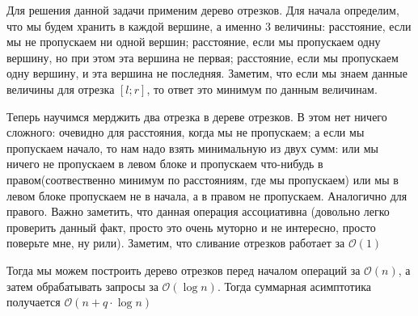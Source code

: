 \documentclass[12pt,a4paper]{report}
\begin{document}
Для решения данной задачи применим дерево отрезков. Для начала определим, что мы будем хранить в каждой вершине, а именно 3 величины: расстояние, если мы не пропускаем ни одной вершин; расстояние, если мы пропускаем одну вершину, но при этом эта вершина не первая; расстояние, если мы пропускаем одну вершину, и эта вершина не последняя. Заметим, что если мы знаем данные величины для отрезка $[l; r]$, то ответ это минимум по данным величинам.\par
Теперь научимся мерджить два отрезка в дереве отрезков. В этом нет ничего сложного: очевидно для расстояния, когда мы не пропускаем; а если мы пропускаем начало, то нам надо взять минимальную из двух сумм: или мы ничего не пропускаем в левом блоке и пропускаем что-нибудь в правом(соотвественно минимум по расстояниям, где мы пропускаем) или мы в левом блоке пропускаем не в начала, а в правом не пропускаем. Аналогично для правого. Важно заметить, что данная операция ассоциативна (довольно легко проверить данный факт, просто это очень муторно и не интересно, просто поверьте мне, ну рили). Заметим, что сливание отрезков работает за $\mathcal{O}(1)$ \par
Тогда мы можем построить дерево отрезков перед началом операций за $\mathcal{O}(n)$, а затем обрабатывать запросы за $\mathcal{O}(\log n)$. Тогда суммарная асимптотика получается $\mathcal{O}(n + q\cdot \log n)$
\end{document}
